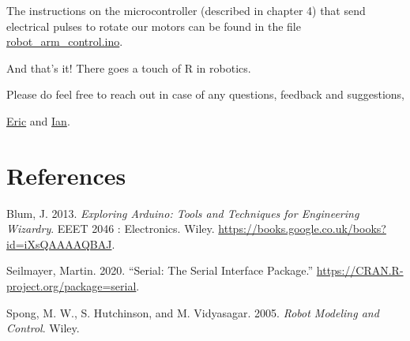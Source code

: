 \documentclass[
  letterpaper,
  DIV=11,
  numbers=noendperiod]{scrreprt}
\newlength{\cslhangindent}
\newlength{\cslentryspacingunit} %
\newenvironment{CSLReferences}[2] %
 {%
  \setlength{\parindent}{0pt}
  \ifodd #1
  \let\oldpar\par
  \def\par{\hangindent=\cslhangindent\oldpar}
  \fi
  \setlength{\parskip}{#2\cslentryspacingunit}
 }%
 {}
\begin{document}
The instructions on the microcontroller (described in chapter 4) that
send electrical pulses to rotate our motors can be found in the file
\href{https://github.com/R-icntay/rstudio_conf22_R_in_robotics/blob/main/arduino_code/robot_arm_control.ino}{robot\_arm\_control.ino}.

And that's it! There goes a touch of R in robotics.

Please do feel free to reach out in case of any questions, feedback and
suggestions,

\href{https://twitter.com/ericntay}{Eric} and
\href{https://twitter.com/Entity_4004}{Ian}.


\hypertarget{references}{%
\chapter*{References}\label{references}}

\hypertarget{refs}{}
\begin{CSLReferences}{1}{0}
\leavevmode{}%
Blum, J. 2013. \emph{Exploring Arduino: Tools and Techniques for
Engineering Wizardry}. EEET 2046 : Electronics. Wiley.
\url{https://books.google.co.uk/books?id=iXsQAAAAQBAJ}.

\leavevmode{}%
Seilmayer, Martin. 2020. {``Serial: The Serial Interface Package.''}
\url{https://CRAN.R-project.org/package=serial}.

\leavevmode{}%
Spong, M. W., S. Hutchinson, and M. Vidyasagar. 2005. \emph{Robot
Modeling and Control}. Wiley.

\end{CSLReferences}
\end{document}
